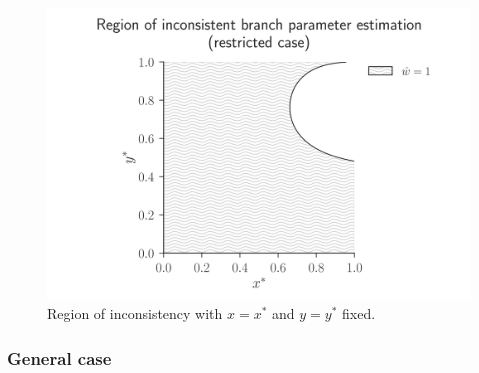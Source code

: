 \documentclass{article}
\begin{document}
\begin{figure}
\centering
\includegraphics[width=\textwidth]{branch-length-inconsistency-inkscape}
\caption{Region of inconsistency with $x=x^*$ and $y=y^*$ fixed.}
\label{fig:bl-inconsistency}
\end{figure}

\subsubsection*{General case}
\end{document}
